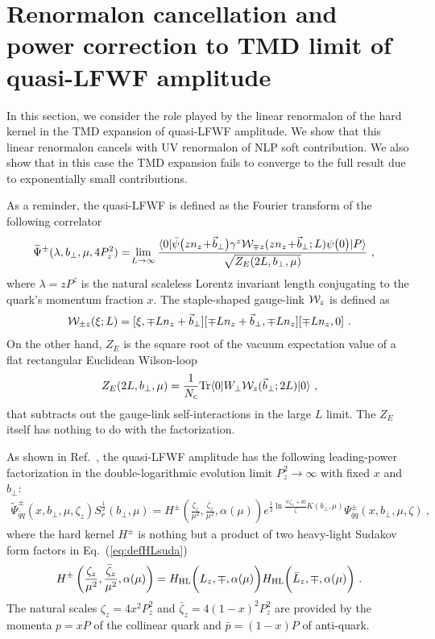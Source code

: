 \documentclass[a4paper,11pt]{article}
\begin{document}
\section{Renormalon cancellation and power correction to TMD limit of quasi-LFWF amplitude}\label{sec:LFWF}
In this section, we consider the role played by the linear renormalon of the hard kernel in the TMD expansion of quasi-LFWF amplitude. We show that this linear renormalon cancels with UV renormalon of NLP soft contribution. We also show that in this case the TMD expansion fails to converge to the full result due to exponentially small contributions. 

As a reminder, the quasi-LFWF is defined as the Fourier transform of the following correlator~\cite{Ji:2020ect,Ji:2021znw}
\begin{align}\label{eq:quasiWF1}
&\widetilde \Psi^{\pm }(\lambda,b_\perp,\mu,4P_z^2)=\!\lim_{L\to\infty}\frac{\langle 0|\bar \psi\big(zn_z\!+\!\vec{b}_\perp\big)\gamma^z{\cal W}_{\mp z}(zn_z\!+\!\vec{b}_\perp;L)\psi\big(0\big)|P\rangle}{\sqrt{Z_E(2L,b_\perp,\mu)}} \ ,
\end{align}
where $\lambda=zP^z$ is the natural scaleless Lorentz invariant length conjugating to the quark's momentum fraction $x$. The staple-shaped gauge-link ${\cal W}_z$ is defined as 
\begin{align}\label{eq:staplez}
{\cal W}_{\pm z}(\xi;L)= [\xi,\mp Ln_z+\vec{b}_\perp][\mp Ln_z+\vec{b}_\perp,\mp Ln_z][\mp Ln_z,0] \ .
\end{align}
On the other hand, $Z_E$ is the square root of the vacuum expectation value of a flat rectangular Euclidean Wilson-loop
\begin{align}\label{eq:Z_E}
Z_E(2L,b_\perp,\mu)=\frac{1}{N_c}{\rm Tr}\langle 0|W_{\perp}{\cal W}_z(\vec{b}_\perp;2L)|0\rangle \ ,
\end{align}
that subtracts out the gauge-link self-interactions in the large $L$ limit. The $Z_E$ itself has nothing to do with the factorization. 

As shown in Ref.~\cite{Ji:2021znw}, the quasi-LFWF amplitude has the following leading-power factorization in the double-logarithmic evolution limit $P_z^2 \rightarrow \infty$ with fixed $x$ and $b_\perp$:
\begin{align}\label{eq:quai_fac_1}
\tilde \Psi^{\pm}_{\bar q q}(x,b_\perp,\mu,\zeta_z)S_{r}^{\frac{1}{2}}(b_\perp,\mu) =H^\pm\left(\frac{\zeta_z}{\mu^2},\frac{\bar \zeta_z}{\mu^2},\alpha(\mu)\right)e^{\frac{1}{2}\ln \frac{\mp \zeta_z+i0}{\zeta}K(b_\perp,\mu)}\Psi_{\bar qq}^\pm(x,b_\perp,\mu,\zeta) \ ,
\end{align}
where the hard kernel $H^{\pm}$ is nothing but a product of two heavy-light Sudakov form factors in Eq.~(\ref{eq:defHLsuda})
\begin{align}\label{eq:Hplusmins}
H^\pm\left(\frac{\zeta_z}{\mu^2},\frac{\bar \zeta_z}{\mu^2},\alpha(\mu)\right)=H_{\rm HL}\bigg(L_z,\mp,\alpha(\mu)\bigg)H_{\rm HL}\bigg(\bar L_z,\mp,\alpha(\mu)\bigg) \ .
\end{align}
The natural scales $\zeta_z=4x^2P_z^2$ and $\bar \zeta_z=4(1-x)^2P_z^2$ are provided  by the momenta $p=xP$ of the collinear quark and $\bar p=(1-x)P$ of anti-quark. 
\end{document}

